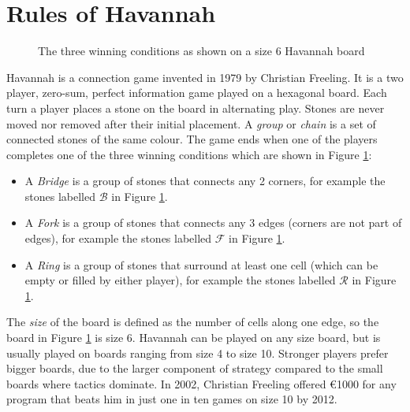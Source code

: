 
\section{Rules of Havannah}


\begin{figure}
\centering
\begin{HavannahBoard}[board size=6,coordinate style=classical]
\end{HavannahBoard}
\caption{The three winning conditions as shown on a size 6 Havannah board}
\label{fig:rules}
\end{figure}

Havannah is a connection game invented in 1979 by Christian Freeling. It is a two player, zero-sum, perfect information game played on a hexagonal board. Each turn a player places a stone on the board in alternating play. Stones are never moved nor removed after their initial placement. A \textit{group} or \textit{chain} is a set of connected stones of the same colour. The game ends when one of the players completes one of the three winning conditions which are shown in Figure \ref{fig:rules}:
\begin{itemize}
	\setlength{\itemsep}{0pt}
	\setlength{\parskip}{0pt}
	\setlength{\parsep}{0pt}
	\item A \textit{Bridge} is a group of stones that connects any 2 corners, for example the stones labelled $\mathcal B$ in Figure \ref{fig:rules}.
	\item A \textit{Fork} is a group of stones that connects any 3 edges (corners are not part of edges), for example the stones labelled $\mathcal F$ in Figure \ref{fig:rules}.
	\item A \textit{Ring} is a group of stones that surround at least one cell (which can be empty or filled by either player), for example the stones labelled $\mathcal R$ in Figure \ref{fig:rules}.
\end{itemize}

The \textit{size} of the board is defined as the number of cells along one edge, so the board in Figure \ref{fig:rules} is size 6. Havannah can be played on any size board, but is usually played on boards ranging from size 4 to size 10. Stronger players prefer bigger boards, due to the larger component of strategy compared to the small boards where tactics dominate. In 2002, Christian Freeling offered \euro 1000 for any program that beats him in just one in ten games on size 10 by 2012.

